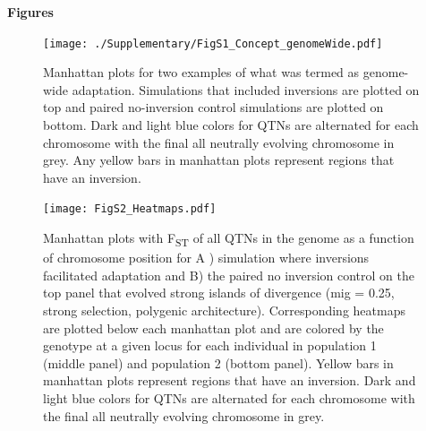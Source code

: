 \documentclass[10pt, scrartlc]{article}
\begin{document}
\pagecolor{white}

\begin{center}
{ \Large \bf Figures }
\end{center}

\listoffigures

\clearpage
\newpage

\begin{figure}[h]
	\begin{center}
		\texttt{[image: ./Supplementary/FigS1\_Concept\_genomeWide.pdf]}
	\end{center}
	\caption[Genome-wide divergence region examples]{Manhattan plots for two examples of what was termed as genome-wide adaptation. Simulations that included inversions are plotted on top and paired no-inversion control simulations are plotted on bottom. Dark and light blue colors for QTNs are alternated for each chromosome with the final all neutrally evolving chromosome in grey. Any yellow bars in manhattan plots represent regions that have an inversion.}
\end{figure}

\clearpage
\newpage

\begin{figure}[h]
	\begin{center}
		\texttt{[image: FigS2\_Heatmaps.pdf]}
	\end{center}
	\caption[Heatmaps of the genetic architecture of divergence]{Manhattan plots with F\textsubscript{ST} of all QTNs in the genome as a function of chromosome position for A ) simulation where inversions facilitated adaptation and B) the paired no inversion control on the top panel that evolved strong islands of divergence (mig = 0.25, strong selection, polygenic architecture). Corresponding heatmaps are plotted below each manhattan plot and are colored by the genotype at a given locus for each individual in population 1 (middle panel) and population 2 (bottom panel). Yellow bars in manhattan plots represent regions that have an inversion. Dark and light blue colors for QTNs are alternated for each chromosome with the final all neutrally evolving chromosome in grey. }
\end{figure}

\clearpage
\newpage
\end{document}
